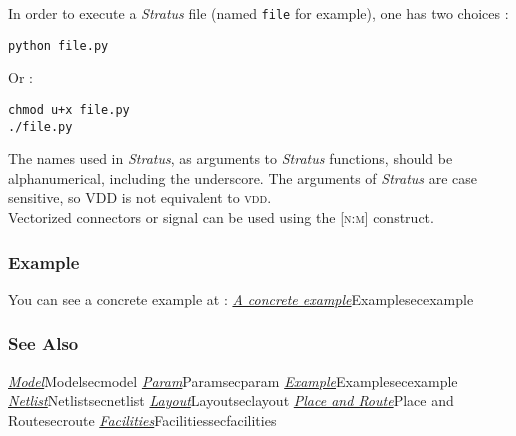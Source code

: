 \indent In order to execute a \emph{Stratus} file (named \verb-file- for example), one has two choices :
\begin{verbatim}
python file.py
\end{verbatim}
\indent Or :
\begin{verbatim}
chmod u+x file.py
./file.py
\end{verbatim}

\indent The names used in \emph{Stratus}, as arguments to \emph{Stratus} functions, should be alphanumerical, including the underscore. The arguments of \emph{Stratus} are case sensitive, so \textsc{VDD} is not equivalent to \textsc{vdd}.\\
    
\indent Vectorized connectors or signal can be used using the \textsc{[n:m]} construct.\\

\subsubsection{Example}

You can see a concrete example at : \hyperref[ref]{\emph{A concrete example}}{}{Example}{secexample}

\subsubsection{See Also}

\hyperref[ref]{\emph{Model}}{}{Model}{secmodel}
\hyperref[ref]{\emph{Param}}{}{Param}{secparam}
\hyperref[ref]{\emph{Example}}{}{Example}{secexample}
\hyperref[ref]{\emph{Netlist}}{}{Netlist}{secnetlist}
\hyperref[ref]{\emph{Layout}}{}{Layout}{seclayout}
\hyperref[ref]{\emph{Place and Route}}{}{Place and Route}{secroute}
\hyperref[ref]{\emph{Facilities}}{}{Facilities}{secfacilities}
